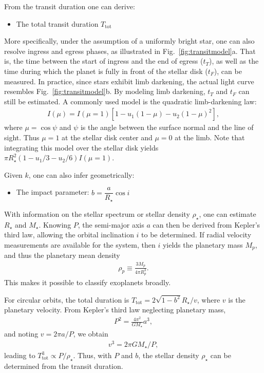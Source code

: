 From the transit duration one can derive:
\begin{itemize}
\item The total transit duration $T_\mathrm{tot}$
\end{itemize}

More specifically, under the assumption of a uniformly bright star, one can also resolve ingress and egress phases, as illustrated in Fig.~\ref{fig:transitmodel}a. That is, the time between the start of ingress and the end of egress ($t_T$), as well as the time during which the planet is fully in front of the stellar disk ($t_F$), can be measured. In practice, since stars exhibit limb darkening, the actual light curve resembles Fig.~\ref{fig:transitmodel}b. By modeling limb darkening, $t_T$ and $t_F$ can still be estimated. A commonly used model is the quadratic limb-darkening law:
\begin{align}
I(\mu) = I(\mu=1) [ 1 - u_1 (1 - \mu) - u_2 (1 -\mu)^2],
\end{align}
where $\mu = \cos{\psi}$ and $\psi$ is the angle between the surface normal and the line of sight. Thus $\mu=1$ at the stellar disk center and $\mu=0$ at the limb. Note that integrating this model over the stellar disk yields $\pi R_\star^2 (1 - u_1/3 - u_2/6) I(\mu=1)$.  

Given $k$, one can also infer geometrically:
\begin{itemize}
\item The impact parameter: $b = \dfrac{a}{R_\star} \cos{i}$
\end{itemize}

With information on the stellar spectrum or stellar density $\rho_\star$, one can estimate $R_\star$ and $M_\star$. Knowing $P$, the semi-major axis $a$ can then be derived from Kepler’s third law, allowing the orbital inclination $i$ to be determined. If radial velocity measurements are available for the system, then $i$ yields the planetary mass $M_p$, and thus the planetary mean density
\begin{align}
\rho_p \equiv \frac{3 M_p}{4 \pi R_p^3}.
\end{align}
This makes it possible to classify exoplanets broadly.  

For circular orbits, the total duration is $T_\mathrm{tot} = 2 \sqrt{1-b^2} R_\star/v$, where $v$ is the planetary velocity. From Kepler’s third law neglecting planetary mass,
\begin{align}
P^2 = \frac{4 \pi^2}{G M_\star} a^3,
\end{align}
and noting $v=2 \pi a/P$, we obtain
\begin{align}
v^3=2 \pi G M_\star/P,
\end{align}
leading to $T_\mathrm{tot}^3 \propto P/\rho_\star$. Thus, with $P$ and $b$, the stellar density $\rho_\star$ can be determined from the transit duration.  

